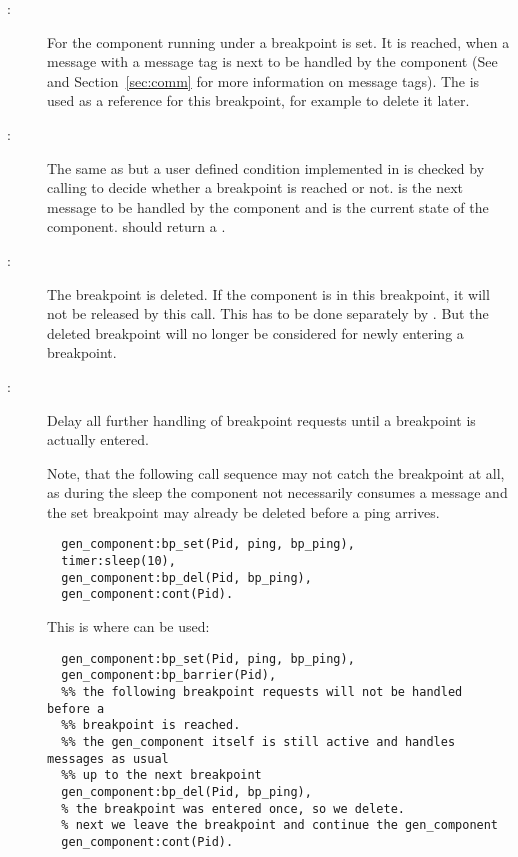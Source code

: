 \begin{description}
\item[:] For the
  component running under  a breakpoint  is set. It
  is reached, when a message with a message tag  is next to be
  handled by the component (See  and
  Section~\ref{sec:comm} for more information on message tags). The
   is used as a reference for this breakpoint, for example to
  delete it later.
\item[:]
  The same as  but a user defined
  condition implemented in  is
  checked by calling  to decide
  whether a breakpoint is reached or not.  is the next message
  to be handled by the component and  is the current state of
  the component.  should return a .
\item[:] The breakpoint
   is deleted. If the component is in this breakpoint, it will
  not be released by this call. This has to be done separately by
  . But the deleted breakpoint will no
  longer be considered for newly entering a breakpoint.
\item[:]
  Delay all further handling of breakpoint requests until a breakpoint is
  actually entered.

  Note, that the following call sequence may not catch the breakpoint at
  all, as during the sleep the component not necessarily consumes a
   message and the set breakpoint may already be deleted before a
  ping arrives.

  \begin{lstlisting}
  gen_component:bp_set(Pid, ping, bp_ping),
  timer:sleep(10),
  gen_component:bp_del(Pid, bp_ping),
  gen_component:cont(Pid).
  \end{lstlisting}

  This is where  can be used:

  \begin{lstlisting}
  gen_component:bp_set(Pid, ping, bp_ping),
  gen_component:bp_barrier(Pid),
  %% the following breakpoint requests will not be handled before a
  %% breakpoint is reached.
  %% the gen_component itself is still active and handles messages as usual
  %% up to the next breakpoint
  gen_component:bp_del(Pid, bp_ping),
  % the breakpoint was entered once, so we delete.
  % next we leave the breakpoint and continue the gen_component
  gen_component:cont(Pid).
  \end{lstlisting}
\end{description}

